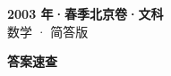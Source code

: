 \documentclass[zihao=-4, a4paper]{ctexart}
\begin{document}
\begin{center}
  {\Large\bfseries 2003 年·春季北京卷·文科}\\[4pt]
  {\large 数学 · 简答版}
\end{center}
\medskip
{}

\clearpage
{}
\begin{center}{\Large\bfseries 答案速查}\end{center}
\medskip

\end{document}
